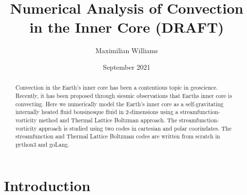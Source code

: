 \documentclass{article}
\title{Numerical Analysis of Convection in the Inner Core (DRAFT)}
\author{Maximilian Williams}
\date{September 2021}
\begin{document}
\maketitle

\begin{abstract}
	Convection in the Earth's inner core has been a contentious topic in geoscience. Recently, it has been proposed through siesmic observations that Earths inner core is convecting. Here we numerically model the Earth's inner core as a self-gravitating internally heated fluid bousinesque fluid in 2-dimensions using a streamfunction-vorticity method and Thermal Lattice Boltzman approach. The streamfunction-vorticity approach is studied using two codes in cartesian and polar coorindates. The streamfunction and Thermal Lattice Boltzman codes are written from scratch in python3 and goLang. 
 
\end{abstract}

\section*{Introduction}
\end{document}
